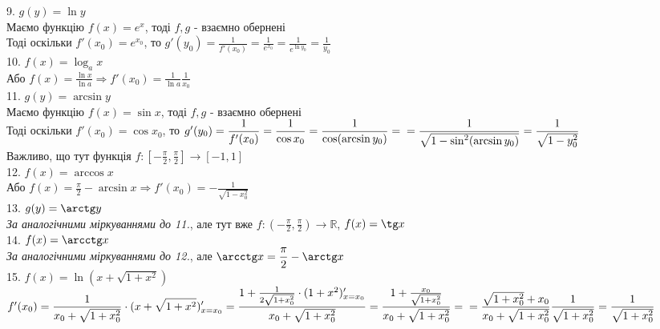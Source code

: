 \documentclass[a4paper, 14pt]{article}
\theoremstyle{theoremdd}
\theoremstyle{theoremdd}
\theoremstyle{theoremdd}
\theoremstyle{theoremdd}
\theoremstyle{theoremdd}
\theoremstyle{theoremdd}
\theoremstyle{theoremdd}
\theoremstyle{theoremdd}
\begin{document}
9. $g(y) = \ln y$\\
Маємо функцію $f(x) = e^x$, тоді $f,g$ - взаємно обернені\\
Тоді оскільки $f'(x_0) = e^{x_0}$, то $g'(y_0) = \displaystyle \frac{1}{f'(x_0)} = \frac{1}{e^{x_0}} = \frac{1}{e^{\ln y_0}} = \frac{1}{y_0}$
\bigskip \\

10. $f(x) = \log_a x$\\
Або $f(x) = \displaystyle \frac{\ln x}{\ln a} \Rightarrow f'(x_0) = \frac{1}{\ln a} \frac{1}{x_0}$
\bigskip \\

11. $g(y) = \arcsin y$\\
Маємо функцію $f(x) = \sin x$, тоді $f,g$ - взаємно обернені\\
Тоді оскільки $f'(x_0) = \cos x_0$, то $g'(y_0) = \displaystyle \frac{1}{f'(x_0)} = \frac{1}{\cos x_0}= \frac{1}{\cos (\arcsin y_0)} = \\ = \frac{1}{\sqrt{1- \sin^2(\arcsin y_0)}} = \frac{1}{\sqrt{1-y_0^2}}$\\
Важливо, що тут функція $f: \displaystyle \left[-\frac{\pi}{2},\frac{\pi}{2}\right] \to [-1,1]$
\bigskip \\

12. $f(x) = \arccos x$\\
Або $f(x) = \displaystyle \frac{\pi}{2} - \arcsin x \Rightarrow f'(x_0) = - \frac{1}{\sqrt{1-x_0^2}}$
\bigskip \\

13. $g(y) = \arctg y$\\
\textit{За аналогічними міркуваннями до 11.}, але тут вже $f: \displaystyle \left(-\frac{\pi}{2},\frac{\pi}{2}\right) \to \mathbb{R}$, $f(x) = \tg x$
\bigskip \\

14. $f(x) = \arcctg x$\\
\textit{За аналогічними міркуваннями до 12.}, але $\arcctg x = \displaystyle \frac{\pi}{2} - \arctg x$
\bigskip \\

15. $f(x) = \ln(x + \sqrt{1+x^2})$\\
$f'(x_0) = \displaystyle \frac{1}{x_0+ \sqrt{1+x_0^2}} \cdot (x+ \sqrt{1+x^2})'_{x = x_0} = \frac{1+ \frac{1}{2\sqrt{1+x_0^2}} \cdot (1+x^2)'_{x=x_0}}{x_0+ \sqrt{1+x_0^2}} = \frac{1+ \frac{x_0}{\sqrt{1+x_0^2}}}{x_0 + \sqrt{1+x_0^2}} = \\ = \frac{\sqrt{1+x_0^2}+x_0}{x_0 + \sqrt{1 + x_0^2}} \frac{1}{\sqrt{1+x_0^2}} = \frac{1}{\sqrt{1+x_0^2}}$
\end{document}
